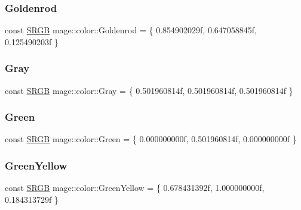 \subsubsection{\texorpdfstring{Goldenrod}{Goldenrod}}
{\footnotesize\ttfamily const \hyperlink{structmage_1_1_s_r_g_b}{S\+R\+GB} mage\+::color\+::\+Goldenrod = \{ 0.\+854902029f, 0.\+647058845f, 0.\+125490203f \}}

\hypertarget{namespacemage_1_1color_a8f0f4dd06fc37474e20a347af3523dcf}{}\label{namespacemage_1_1color_a8f0f4dd06fc37474e20a347af3523dcf} 
\subsubsection{\texorpdfstring{Gray}{Gray}}
{\footnotesize\ttfamily const \hyperlink{structmage_1_1_s_r_g_b}{S\+R\+GB} mage\+::color\+::\+Gray = \{ 0.\+501960814f, 0.\+501960814f, 0.\+501960814f \}}

\hypertarget{namespacemage_1_1color_a70a471f8796824272417d82a0c78b63b}{}\label{namespacemage_1_1color_a70a471f8796824272417d82a0c78b63b} 
\subsubsection{\texorpdfstring{Green}{Green}}
{\footnotesize\ttfamily const \hyperlink{structmage_1_1_s_r_g_b}{S\+R\+GB} mage\+::color\+::\+Green = \{ 0.\+000000000f, 0.\+501960814f, 0.\+000000000f \}}

\hypertarget{namespacemage_1_1color_a19b0da7d9b4d5ddb2eceec40df11ba57}{}\label{namespacemage_1_1color_a19b0da7d9b4d5ddb2eceec40df11ba57} 
\subsubsection{\texorpdfstring{Green\+Yellow}{GreenYellow}}
{\footnotesize\ttfamily const \hyperlink{structmage_1_1_s_r_g_b}{S\+R\+GB} mage\+::color\+::\+Green\+Yellow = \{ 0.\+678431392f, 1.\+000000000f, 0.\+184313729f \}}

\hypertarget{namespacemage_1_1color_a50381d0ae2bed45ad565661cbcc1729a}{}\label{namespacemage_1_1color_a50381d0ae2bed45ad565661cbcc1729a} 
